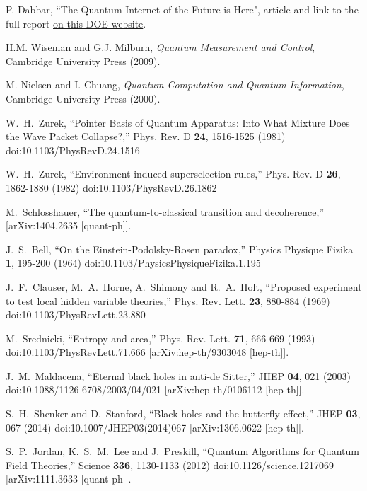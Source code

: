 \documentclass[a4paper,11pt]{article}
\begin{document}
\begin{thebibliography}{99}
 P. Dabbar, ``The Quantum Internet of the Future is Here", article and link to the full report
 \href{https://www.energy.gov/articles/quantum-internet-future-here}{on this DOE website}.
 
H.M. Wiseman and G.J. Milburn,
{\it Quantum Measurement and Control},
Cambridge University Press (2009).
 
M. Nielsen and I. Chuang,
{\it Quantum Computation and Quantum Information},
Cambridge University Press (2000).
 
W.~H.~Zurek,
``Pointer Basis of Quantum Apparatus: Into What Mixture Does the Wave Packet Collapse?,''
Phys. Rev. D \textbf{24}, 1516-1525 (1981)
doi:10.1103/PhysRevD.24.1516
 
W.~H.~Zurek,
``Environment induced superselection rules,''
Phys. Rev. D \textbf{26}, 1862-1880 (1982)
doi:10.1103/PhysRevD.26.1862
 
M.~Schlosshauer,
``The quantum-to-classical transition and decoherence,''
[arXiv:1404.2635 [quant-ph]].
 
J.~S.~Bell,
``On the Einstein-Podolsky-Rosen paradox,''
Physics Physique Fizika \textbf{1}, 195-200 (1964)
doi:10.1103/PhysicsPhysiqueFizika.1.195

J.~F.~Clauser, M.~A.~Horne, A.~Shimony and R.~A.~Holt,
``Proposed experiment to test local hidden variable theories,''
Phys. Rev. Lett. \textbf{23}, 880-884 (1969)
doi:10.1103/PhysRevLett.23.880
 
M.~Srednicki,
``Entropy and area,''
Phys. Rev. Lett. \textbf{71}, 666-669 (1993)
doi:10.1103/PhysRevLett.71.666
[arXiv:hep-th/9303048 [hep-th]].

J.~M.~Maldacena,
``Eternal black holes in anti-de Sitter,''
JHEP \textbf{04}, 021 (2003)
doi:10.1088/1126-6708/2003/04/021
[arXiv:hep-th/0106112 [hep-th]].

S.~H.~Shenker and D.~Stanford,
``Black holes and the butterfly effect,''
JHEP \textbf{03}, 067 (2014)
doi:10.1007/JHEP03(2014)067
[arXiv:1306.0622 [hep-th]].


S.~P.~Jordan, K.~S.~M.~Lee and J.~Preskill,
``Quantum Algorithms for Quantum Field Theories,''
Science \textbf{336}, 1130-1133 (2012)
doi:10.1126/science.1217069
[arXiv:1111.3633 [quant-ph]].


\end{thebibliography}
\end{document}
